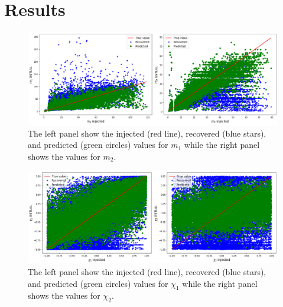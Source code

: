 \documentclass[aps,prd,twocolumn,superscriptaddress,preprintnumbers,floatfix,nofootinbib]{revtex4-2}
\begin{document}
\section{Results}

\begin{figure}[!h]
	\centering
	\includegraphics[width=\linewidth]{m1_m2_chi_comparisons.png}
	\caption{%
	 		The left panel show the injected (red line), recovered (blue stars), and 
			predicted (green circles) values for $m_1$ while the right panel shows the 
			values for $m_2$.}
	\label{m1_m2_chi_comparisons}
\end{figure}

\begin{figure}[!h]
	\centering
	\includegraphics[width=\linewidth]{m_chi1_chi2_comparisons.png}
	\caption{%
	 		The left panel show the injected (red line), recovered (blue stars), and 
			predicted (green circles) values for $\chi_1$ while the right panel shows the 
			values for $\chi_2$.}
	\label{m_chi1_chi2_comparisons}
\end{figure}
\end{document}
